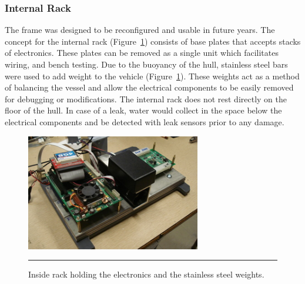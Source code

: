 \subsubsection{Internal Rack}
The frame was designed to be reconfigured and usable in
future years.  The concept for the internal rack (Figure~\ref{rack})
consists of base plates that accepts stacks of electronics.  These
plates can be removed as a single unit which facilitates wiring, and
bench testing.  Due to the buoyancy of the hull, stainless steel bars
were used to add weight to the vehicle (Figure~\ref{rack}).  These weights act as a method of balancing the
vessel and allow the electrical components to be easily removed for debugging
or modifications.  The internal rack does not rest directly on the floor
of the hull.  In case of a leak, water would collect in the space
below the electrical components and be detected with leak sensors
prior to any damage.


\begin{figure}
\begin{center}
 \includegraphics[width=3in]{fig/dsc06466} 
\vspace{.05in}
\hrule
\caption{Inside rack holding the electronics and the stainless steel weights.}\label{rack}
\end{center}
\end{figure}
